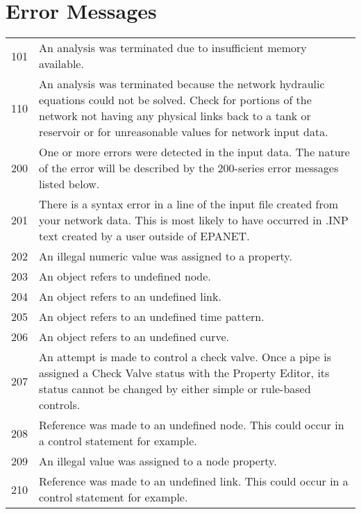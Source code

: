 \chapter{Error Messages}
\begin{longtable}{ c p{12cm}}
\hline
101& An analysis was terminated due to insufficient memory available.\\[6pt]

110& An analysis was terminated because the network hydraulic equations could
not be solved. Check for portions of the network not having any physical
links back to a tank or reservoir or for unreasonable values for network input
data.\\[6pt]

200& One or more errors were detected in the input data. The nature of the error
will be described by the 200-series error messages listed below.\\[6pt]

201& There is a syntax error in a line of the input file created from your network
data. This is most likely to have occurred in .INP text created by a user
outside of EPANET.\\[6pt]

202& An illegal numeric value was assigned to a property.\\[6pt]

203& An object refers to undefined node. \\[6pt]

204& An object refers to an undefined link.\\[6pt]

205& An object refers to an undefined time pattern.\\[6pt]

206& An object refers to an undefined curve.\\[6pt]

207& An attempt is made to control a check valve. Once a pipe is assigned a Check
Valve status with the Property Editor, its status cannot be changed by either
simple or rule-based controls. \\[6pt]

208& Reference was made to an undefined node. This could occur in a control
statement for example. \\[6pt]

209& An illegal value was assigned to a node property. \\[6pt]

210& Reference was made to an undefined link. This could occur in a control
statement for example.  \\[6pt]


\end{longtable}
